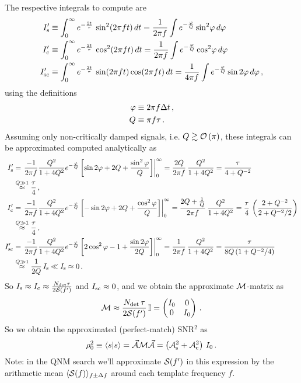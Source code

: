 \documentclass[aps,prd,onecolumn,notitlepage,nofootinbib,superscriptaddress,altaffilletter,floatfix]{revtex4-1}
\begin{document}
The respective integrals to compute are
\begin{align}
  \label{eq:18}
  I_{\mathrm{s}}' &\equiv \int_0^\infty e^{-\frac{2t}{\tau}}\,\sin^2(2\pi f t)\,dt = \frac{1}{2\pi f}\int e^{-\frac{\varphi}{Q}} \sin^2\!\varphi\,d\varphi\\
  I_{\mathrm{c}}' &\equiv \int_0^\infty e^{-\frac{2t}{\tau}}\,\cos^2(2\pi f t)\,dt = \frac{1}{2\pi f}\int e^{-\frac{\varphi}{Q}} \cos^2\!\varphi\,d\varphi\\
  I_{\mathrm{sc}}' &\equiv \int_0^\infty e^{-\frac{2t}{\tau}}\,\sin(2\pi f t)\cos(2\pi f t)\,dt = \frac{1}{4\pi f}\int e^{-\frac{\varphi}{Q}} \sin2\varphi\,d\varphi\,,
\end{align}
using the definitions
\begin{align}
  \label{eq:3}
  \varphi &\equiv 2\pi f \Delta t\,,\\
  Q       &\equiv \pi f \tau\,.
\end{align}
Assuming only non-critically damped signals, i.e. $Q\gtrsim \mathcal{O}\left(\pi\right)$, these integrals can be approximated computed analytically as
\begin{align}
  \label{eq:19}
  I_{\mathrm{s}}' &= \left. \frac{-1}{2\pi f}\frac{Q^2}{1 + 4Q^2}e^{-\frac{\varphi}{Q}}\left[ \sin2\varphi + 2Q + \frac{\sin^2\varphi}{Q}\right]\right|_0^\infty
  = \frac{2Q}{2\pi f}\,\frac{Q^2}{1+4Q^2}
  = \frac{\tau}{4 + Q^{-2}}\notag \\
  & \stackrel{Q\gg1}{\approx} \frac{\tau}{4}\,,\\
  I_{\mathrm{c}}' &= \left. \frac{-1}{2\pi f}\frac{Q^2}{1 + 4Q^2}e^{-\frac{\varphi}{Q}}\left[ -\sin2\varphi + 2Q + \frac{\cos^2\varphi}{Q}\right]\right|_0^\infty
  = \frac{2Q + \frac{1}{Q}}{2\pi f}\,\frac{Q^2}{1+4Q^2} = \frac{\tau}{4}\,\left(\frac{2 + Q^{-2}}{2 + Q^{-2}/2}\right) \notag\\
  & \stackrel{Q\gg1}{\approx} \frac{\tau}{4}\,,\\
  I_{\mathrm{sc}}' &= \left. \frac{-1}{2\pi f}\frac{Q^2}{1 + 4Q^2}e^{-\frac{\varphi}{Q}}\left[ 2\cos^2\varphi - 1 + \frac{\sin2\varphi}{2Q}\right]\right|_0^\infty
  = \frac{1}{2\pi f}\,\frac{Q^2}{1+4Q^2} = \frac{\tau}{8Q\,(1 + Q^{-2}/4)}\notag\\
  &\stackrel{Q\gg1}{\approx} \frac{1}{2Q}\,I_{\mathrm{s}} \ll I_{\mathrm{s}} \approx 0\,.
\end{align}
So $I_{\mathrm{s}} \approx I_{\mathrm{c}} \approx \frac{N_{\mathrm{det}}\tau}{2\mathcal{S}(f')}$ and $I_{\mathrm{sc}}\approx 0$, and we obtain the approximate $\mathcal{M}$-matrix as
\begin{equation}
  \label{eq:42}
  \mathcal{M} \approx \frac{N_{\mathrm{det}}\,\tau}{2\mathcal{S}(f')}\,\mathbb{I} = \begin{pmatrix} I_0 & 0 \\ 0 & I_0 \end{pmatrix}\,.
\end{equation}
So we obtain the approximated (perfect-match) SNR$^2$ as
\begin{equation}
  \label{eq:20}
  \rho_0^2 \equiv \langle s|s\rangle = \vec{\mathcal{A}}\mathcal{M}\vec{\mathcal{A}} = \left(\mathcal{A}_{\mathrm{s}}^2 + \mathcal{A}_{\mathrm{c}}^2\right)\,I_0\,.
\end{equation}
Note: in the QNM search we'll approximate $\mathcal{S}(f')$ in this expression by the arithmetic mean $\langle\mathcal{S}(f)\rangle_{f\pm\Delta f}$ around each
template frequency $f$.


\end{document}
